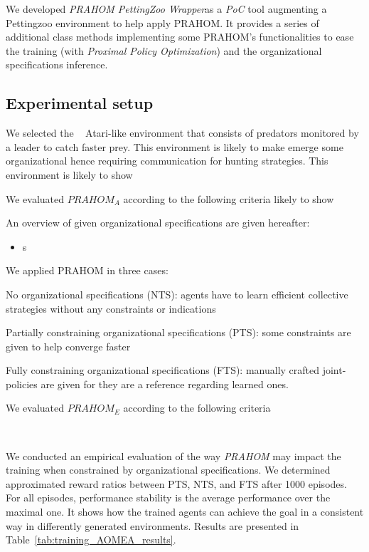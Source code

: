 \documentclass[runningheads]{llncs}
\begin{document}
We developed \emph{PRAHOM PettingZoo Wrapper}\footnotemark[2] as a \emph{PoC} tool augmenting a Pettingzoo environment to help apply PRAHOM. It provides a series of additional class methods implementing some PRAHOM's functionalities to ease the training (with \emph{Proximal Policy Optimization}) and the organizational specifications inference.

\subsection{Experimental setup}

We selected the ~\cite{Lowe2017} Atari-like environment that consists of predators monitored by a leader to catch faster prey. This environment is likely to make emerge some organizational hence requiring communication for hunting strategies.
This environment is likely to show

We evaluated $PRAHOM_A$ according to the following criteria likely to show

An overview of given organizational specifications are given hereafter:
\begin{itemize}
    \item s
\end{itemize}

We applied PRAHOM in three cases:
\begin{enumerate*}[label=\roman*),itemjoin={;\quad}]
    \item No organizational specifications (NTS): agents have to learn efficient collective strategies without any constraints or indications
    \item Partially constraining organizational specifications (PTS): some constraints are given to help converge faster
    \item Fully constraining organizational specifications (FTS): manually crafted joint-policies are given for they are a reference regarding learned ones.
\end{enumerate*}

We evaluated $PRAHOM_E$ according to the following criteria

\

We conducted an empirical evaluation of the way \emph{PRAHOM} may impact the training when constrained by organizational specifications. We determined approximated reward ratios between PTS, NTS, and FTS after 1000 episodes. For all episodes, performance stability is the average performance over the maximal one. It shows how the trained agents can achieve the goal in a consistent way in differently generated environments. Results are presented in Table~\ref{tab:training_AOMEA_results}.
\end{document}
